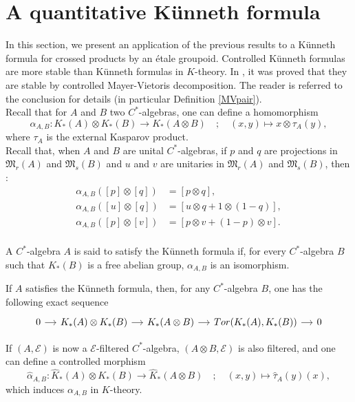 \section{A quantitative Künneth formula}

In this section, we present an application of the previous results to a Künneth formula for crossed products by an étale groupoid. Controlled Künneth formulas are more stable than Künneth formulas in $K$-theory. In \cite{OY4}, it was proved that they are stable by controlled Mayer-Vietoris decomposition. The reader is referred to the conclusion for details (in particular Definition \ref{MVpair}). \\ 

Recall that for $A$ and $B$ two $C^*$-algebras, one can define a homomorphism
\[\alpha_{A,B} : K_*(A)\otimes K_*(B)\rightarrow K_*(A\otimes B) \quad ; \quad (x,y)\mapsto x\otimes   \tau_A(y),\]
where $\tau_A$ is the external Kasparov product.\\

Recall that, when $A$ and $B$ are unital $C^*$-algebras, if $p$ and $q$ are projections in $\mathfrak M_r(A)$ and $\mathfrak M_s(B)$ and $u$ and $v$ are unitaries in $\mathfrak M_r(A)$ and $\mathfrak M_s(B)$, then :
\[\begin{array}{rl}
\alpha_{A,B}([p]\otimes [q]) & = [p\otimes q], \\
\alpha_{A,B}([u]\otimes [q]) & = [u \otimes q +1\otimes (1-q)], \\
\alpha_{A,B}([p]\otimes [v]) & = [p\otimes v +(1-p)\otimes v] .\\
\end{array}\]

\begin{definition}
A $C^*$-algebra $A$ is said to satisfy the Künneth formula if, for every $C^*$-algebra $B$ such that $K_*(B)$ is a free abelian group, $\alpha_{A,B}$ is an isomorphism.
\end{definition}

If $A$ satisfies the Künneth formula, then, for any $C^*$-algebra $B$, one has the following exact sequence
\[\begin{tikzcd}[column sep = small] 0 \arrow{r} & K_*(A)\otimes K_*(B)\arrow{r} & K_*(A\otimes B) \arrow{r} & Tor(K_*(A),K_*(B))\arrow{r} & 0 \end{tikzcd}\]

If $(A,\mathcal E)$ is now a $\mathcal E$-filtered $C^*$-algebra, $(A\otimes B,\mathcal E)$ is also filtered, and one can define a controlled morphism
\[\hat\alpha_{A,B} : \hat K_*(A)\otimes K_*(B)\rightarrow \hat K_*(A\otimes B) \quad ; \quad (x,y)\mapsto \hat\tau_A(y)(x),\]
which induces $\alpha_{A,B}$ in $K$-theory. \\

